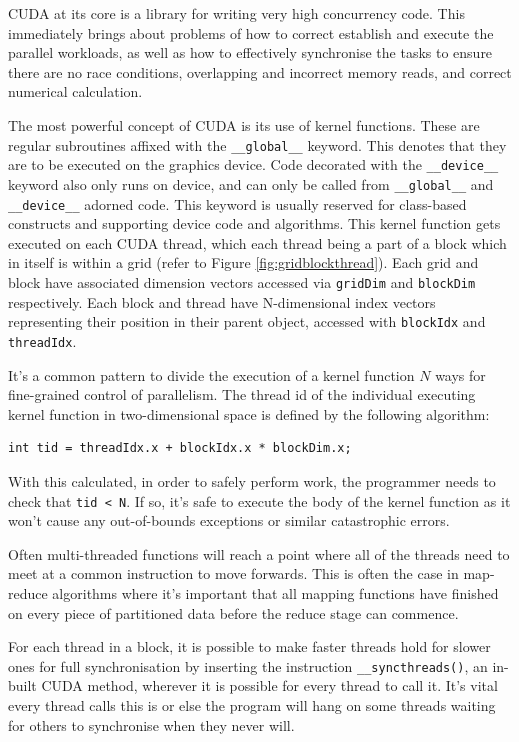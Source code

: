 \documentclass[conference]{IEEEtran}
\begin{document}
CUDA at its core is a library for writing very high concurrency code. This immediately brings about problems of how to correct establish and execute the parallel workloads, as well as how to effectively synchronise the tasks to ensure there are no race conditions, overlapping and incorrect memory reads, and correct numerical calculation.

The most powerful concept of CUDA is its use of kernel functions. These are regular subroutines affixed with the \texttt{\_\_global\_\_} keyword. This denotes that they are to be executed on the graphics device. Code decorated with the \texttt{\_\_device\_\_} keyword also only runs on device, and can only be called from \texttt{\_\_global\_\_} and \texttt{\_\_device\_\_} adorned code. This keyword is usually reserved for class-based constructs and supporting device code and algorithms. This kernel function gets executed on each CUDA thread, which each thread being a part of a block which in itself is within a grid (refer to Figure \ref{fig:gridblockthread}). Each grid and block have associated dimension vectors accessed via \texttt{gridDim} and \texttt{blockDim} respectively. Each block and thread have N-dimensional index vectors representing their position in their parent object, accessed with \texttt{blockIdx} and \texttt{threadIdx}.

It's a common pattern to divide the execution of a kernel function $N$ ways for fine-grained control of parallelism. The thread id of the individual executing kernel function in two-dimensional space is defined by the following algorithm:

\begin{lstlisting}[breaklines]
    int tid = threadIdx.x + blockIdx.x * blockDim.x; 
\end{lstlisting}

With this calculated, in order to safely perform work, the programmer needs to check that \verb|tid < N|. If so, it's safe to execute the body of the kernel function as it won't cause any out-of-bounds exceptions or similar catastrophic errors.

Often multi-threaded functions will reach a point where all of the threads need to meet at a common instruction to move forwards. This is often the case in map-reduce algorithms where it's important that all mapping functions have finished on every piece of partitioned data before the reduce stage can commence.

For each thread in a block, it is possible to make faster threads hold for slower ones for full synchronisation by inserting the instruction \texttt{\_\_syncthreads()}, an in-built CUDA method, wherever it is possible for every thread to call it. It's vital every thread calls this is or else the program will hang on some threads waiting for others to synchronise when they never will.
\end{document}
